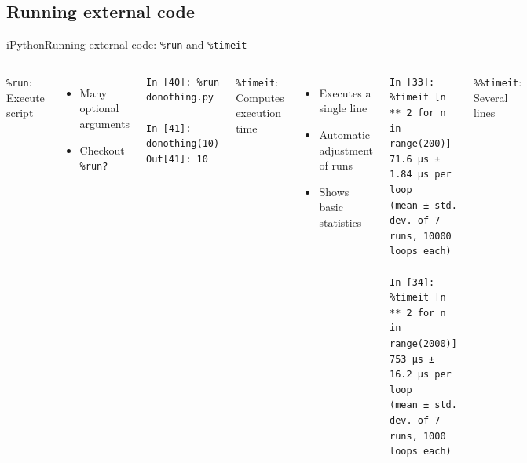 \documentclass[10pt,compress]{beamer} %
\begin{document}
\subsection{Running external code}
\begin{frame}[fragile]{iPython}{Running external code: \texttt{\%run} and \texttt{\%timeit}}
    \begin{columns}
	   \texttt{\%run}: Execute script
		\begin{itemize}
			\item Many optional arguments
			\item Checkout \texttt{\%run?}
		\end{itemize}
		\footnotesize{
	   \begin{exampleblock}{}
	   \vspace{-0.2cm}
	   \begin{verbatim}
In [40]: %run donothing.py

In [41]: donothing(10)
Out[41]: 10
	   \end{verbatim}
	   \vspace{-0.2cm}
	   \end{exampleblock}
		}

	   \texttt{\%timeit}: Computes execution time
		\begin{itemize}
			\item Executes a single line
			\item Automatic adjustment of runs
			\item Shows basic statistics
		\end{itemize}

		\footnotesize{
	   \begin{exampleblock}{}
	   \vspace{-0.2cm}
	   \begin{verbatim}
In [33]: %timeit [n ** 2 for n in range(200)]
71.6 µs ± 1.84 µs per loop 
(mean ± std. dev. of 7 runs, 10000 loops each)

In [34]: %timeit [n ** 2 for n in range(2000)]
753 µs ± 16.2 µs per loop 
(mean ± std. dev. of 7 runs, 1000 loops each)
\end{verbatim}
	   \vspace{-0.2cm}
	   \end{exampleblock}
		}

		\normalsize{
	   \texttt{\%\%timeit}: Several lines\\
	   }
	\end{columns}

\end{frame}
\end{document}
